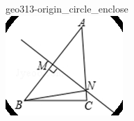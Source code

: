 \documentclass[12pt]{article}
\begin{document}
\begin{center}
\begin{minipage}{0.32\textwidth}
\end{minipage}
\hfill\begin{minipage}{0.32\textwidth}\centering
geo313-origin\_circle\_enclose\\
\includegraphics[width=0.95\linewidth]{out_rommath_origin/items/geo313-origin/assets/figure_circle.png}
\end{minipage}
\par
\end{center}
\bigskip
\end{document}
